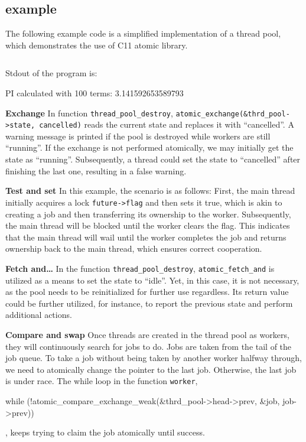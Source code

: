 \documentclass[fontsize=10pt, oneside]{scrartcl}
\newcommand{\monobox}[1]{\mbox{\texttt{#1}}}
\newcommand{\clang}[1]{C}
\begin{document}
\subsection{example}
\label{rmw_example}
The following example code is a simplified implementation of a thread pool, which demonstrates the use of \clang{}11 atomic library.

\inputminted{c}{./examples/rmw_example.c}

Stdout of the program is:
\begin{ccode}
PI calculated with 100 terms: 3.141592653589793
\end{ccode}

\textbf{Exchange}
In function \monobox{thread\_pool\_destroy}, \monobox{atomic\_exchange(\&thrd\_pool->state, cancelled)} reads the current state and replaces it with ``cancelled''. 
A warning message is printed if the pool is destroyed while workers are still ``running''. 
If the exchange is not performed atomically, we may initially get the state as ``running''. Subsequently, a thread could set the state to ``cancelled'' after finishing the last one, resulting in a false warning.

\textbf{Test and set}
In this example, the scenario is as follows: 
First, the main thread initially acquires a lock \monobox{future->flag} and then sets it true, 
which is akin to creating a job and then transferring its ownership to the worker. 
Subsequently, the main thread will be blocked until the worker clears the flag. 
This indicates that the main thread will wail until the worker completes the job and returns ownership back to the main thread, which ensures correct cooperation.

\textbf{Fetch and…}
In the function \monobox{thread\_pool\_destroy}, \monobox{atomic\_fetch\_and} is utilized as a means to set the state to ``idle''. 
Yet, in this case, it is not necessary, as the pool needs to be reinitialized for further use regardless.
Its return value could be further utilized, for instance, to report the previous state and perform additional actions.

\textbf{Compare and swap}
Once threads are created in the thread pool as workers, they will continuously search for jobs to do.
Jobs are taken from the tail of the job queue.
To take a job without being taken by another worker halfway through, we need to atomically change the pointer to the last job. 
Otherwise, the last job is under race.
The while loop in the function \monobox{worker},
\begin{ccode}
while (!atomic_compare_exchange_weak(&thrd_pool->head->prev, &job,
                                       job->prev)) {
}
\end{ccode}
, keeps trying to claim the job atomically until success.
\end{document}
